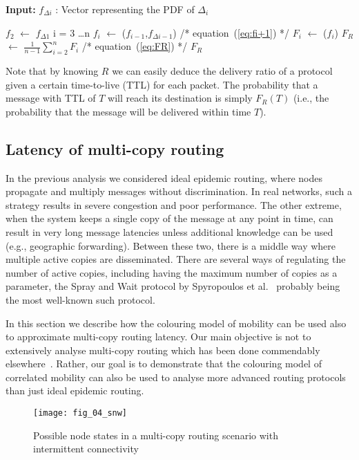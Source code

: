 \documentclass{article}
\newcommand{\assign}{$\leftarrow$ }
\begin{document}
\begin{algfig}[t]
{\bf Input:} $f_{\Delta i}$ : Vector representing the PDF of $\Delta_i$
\begin{codebox}
  \li $f_2$ \assign $f_{\Delta 1}$
  \li {} i = 3 \ldots n
  \li \> $f_i$ \assign {}($f_{i-1}$,$f_{\Delta i-1}$) \>\>\>\>\>\>\>\>/* equation~(\ref{eq:fi+1}) */
  \li $F_i$ \assign {}($f_i$)  
  \li $F_R$ \assign $\frac{1}{n-1}\sum_{i=2}^n  F_i$ \>\>\>\>\>\>\>\>\> /* equation~(\ref{eq:FR}) */
  \li {} $F_R$
  \end{codebox}
  \caption{GetRoutingLatencyDistribution}
  \label{alg:getR}
\end{algfig}

Note that by knowing $R$ we can easily deduce the delivery ratio of a
protocol given a certain time-to-live (TTL) for each packet. The
probability that a message with TTL of $T$ will reach its destination
is simply $F_R(T)$ (i.e., the probability that the message will be
delivered within time $T$).

\subsection{Latency of multi-copy routing}
\label{sec:multicopymodel}
In the previous analysis we considered ideal epidemic routing, where
nodes propagate and multiply messages without discrimination. In real
networks, such a strategy results in severe congestion and poor
performance. The other extreme, when the system keeps a single copy of
the message at any point in time, can result in very long message
latencies unless additional knowledge can be used (e.g., geographic
forwarding). Between these two, there is a middle way where multiple
active copies are disseminated.  There are several ways of regulating
the number of active copies, including having the maximum number of
copies as a parameter, the Spray and Wait protocol by Spyropoulos et
al.~\cite{spyropoulos05} probably being the most well-known such
protocol.

In this section we describe how the colouring model of mobility can be
used also to approximate multi-copy routing latency. Our main
objective is not to extensively analyse multi-copy routing which has
been done commendably elsewhere~\cite{spyropoulos08multi}. Rather, our
goal is to demonstrate that the colouring model of correlated mobility
can also be used to analyse more advanced routing protocols than just
ideal epidemic routing. 

\begin{figure}[ht]
  \centering
  \texttt{[image: fig\_04\_snw]}
  \caption{Possible node states in a multi-copy routing scenario with intermittent connectivity}
  \label{fig:snw}
\end{figure}
\end{document}
